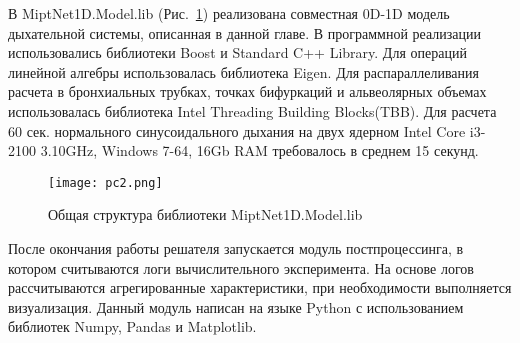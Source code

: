 В MiptNet1D.Model.lib (Рис.~\ref{fig:soft_1d}) реализована совместная 0D-1D модель дыхательной системы, описанная в данной главе. В программной реализации использовались библиотеки Boost и Standard C++ Library. Для операций линейной алгебры использовалась библиотека Eigen. Для распараллеливания расчета в бронхиальных трубках, точках бифуркаций и альвеолярных объемах использовалась библиотека Intel Threading Building Blocks(TBB). Для расчета 60 сек. нормального синусоидального дыхания на двух ядерном Intel Core i3-2100 3.10GHz, Windows 7-64, 16Gb RAM требовалось в среднем 15 секунд.
\begin{figure}[!ht]
	\centering
	\texttt{[image: pc2.png]}
	\caption{Общая структура библиотеки MiptNet1D.Model.lib} \label{fig:soft_1d}
\end{figure}

После окончания работы решателя запускается модуль постпроцессинга, в котором считываются логи вычислительного эксперимента. На основе логов рассчитываются агрегированные характеристики, при необходимости выполняется визуализация. Данный модуль написан на языке Python с использованием библиотек Numpy, Pandas и Matplotlib.

\clearpage
